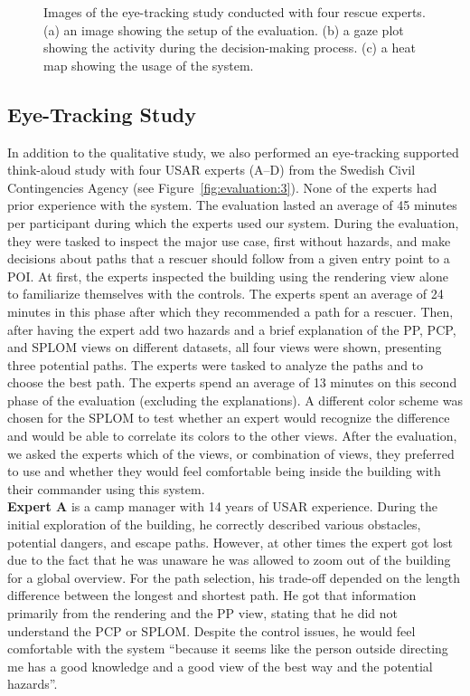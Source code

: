 \documentclass{egpubl}
\begin{document}
\begin{figure}[t]
{		\label{fig:evaluation:1}
	}
	\caption{Images of the eye-tracking study conducted with four rescue experts. (a) an image showing the setup of the evaluation. (b) a gaze plot showing the activity during the decision-making process. (c) a heat map showing the usage of the system.}
	\label{fig:evaluation}
\end{figure}


\subsection{Eye-Tracking Study} \label{sec:evaluation:eye}
In addition to the qualitative study, we also performed an eye-tracking supported think-aloud study with four USAR experts (A--D) from the Swedish Civil Contingencies Agency (see Figure~\ref{fig:evaluation:3}). None of the experts had prior experience with the system. The evaluation lasted an average of 45 minutes per participant during which the experts used our system. During the evaluation, they were tasked to inspect the major use case, first without hazards, and make decisions about paths that a rescuer should follow from a given entry point to a POI. At first, the experts inspected the building using the rendering view alone to familiarize themselves with the controls. The experts spent an average of 24 minutes in this phase after which they recommended a path for a rescuer. Then, after having the expert add two hazards and a brief explanation of the PP, PCP, and SPLOM views on different datasets, all four views were shown, presenting three potential paths. The experts were tasked to analyze the paths and to choose the best path. The experts spend an average of 13 minutes on this second phase of the evaluation (excluding the explanations). A different color scheme was chosen for the SPLOM to test whether an expert would recognize the difference and would be able to correlate its colors to the other views. After the evaluation, we asked the experts which of the views, or combination of views, they preferred to use and whether they would feel comfortable being inside the building with their commander using this system.\\
%
\textbf{Expert A} is a camp manager with 14 years of USAR experience. During the initial exploration of the building, he correctly described various obstacles, potential dangers, and escape paths. However, at other times the expert got lost due to the fact that he was unaware he was allowed to zoom out of the building for a global overview. For the path selection, his trade-off depended on the length difference between the longest and shortest path. He got that information primarily from the rendering and the PP view, stating that he did not understand the PCP or SPLOM. Despite the control issues, he would feel comfortable with the system ``because it seems like the person outside directing me has a good knowledge and a good view of the best way and the potential hazards''.\\
\end{document}
